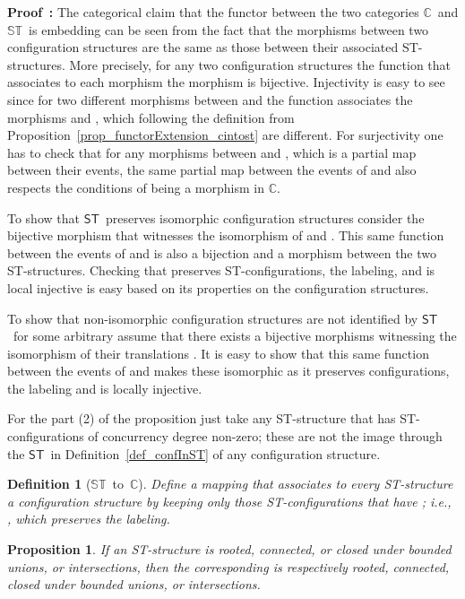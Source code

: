 \documentclass[submission,copyright,creativecommons]{eptcs}
\newtheorem{proposition}[theorem]{Proposition}
\newtheorem{definition}[theorem]{Definition}
\newenvironment{proof}[1][\!\!\,]{\vspace{1ex}\noindent\textbf{Proof #1: }}{\hfill\vspace{2ex}}
\newcommand\allC{\ensuremath{\mathbb{C}}}
\newcommand\allST{\ensuremath{\mathbb{ST}}}
\newcommand\cintost{\ensuremath{\mathsf{ST}}}
\begin{document}
\begin{proof}
The categorical claim that the functor  between the two categories \allC\ and \allST\ is embedding can be seen from the fact that the morphisms between two configuration structures are the same as those between their associated ST-structures. More precisely, for any two configuration structures the function  that associates to each morphism  the morphism  is bijective. Injectivity is easy to see since for two different morphisms  between  and  the function  associates the morphisms  and , which following the definition from Proposition~\ref{prop_functorExtension_cintost} are different. For surjectivity one has to check that for any morphisms  between  and , which is a partial map between their events, the same partial map between the events of  and  also respects the conditions of being a morphism in \allC.

To show that \cintost\ preserves isomorphic configuration structures consider the bijective morphism  that witnesses the isomorphism of  and . This same function between the events of  and  is also a bijection and a morphism between the two ST-structures. Checking that  preserves ST-configurations, the labeling, and is local injective is easy based on its properties on the configuration structures.

To show that non-isomorphic configuration structures are not identified by \cintost\ for some arbitrary  assume that there exists a bijective morphisms  witnessing the isomorphism of their translations . It is easy to show that this same function between the events of  and  makes these isomorphic as it preserves configurations, the labeling and is locally injective.

For the part (2) of the proposition just take any ST-structure that has ST-configurations of concurrency degree non-zero; these are not the image through the \cintost\ in Definition~\ref{def_confInST} of any configuration structure.
\end{proof}

\begin{definition}[\allST\ to\ \allC]\label{def_STtoC}
Define a mapping  that associates to every ST-structure  a configuration structure by keeping only those ST-configu\-rations that have ; i.e., , which preserves the labeling.
\end{definition}



\begin{proposition}\label{prop_ST_config_connect}
If an ST-structure  is rooted, connected, or closed under bounded unions, or intersections, then the corresponding  is respectively rooted, connected, closed under bounded unions, or intersections.
\end{proposition}
\end{document}

